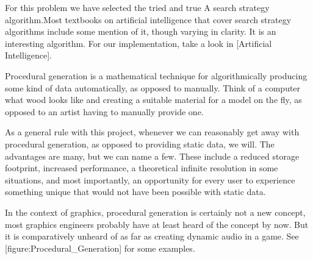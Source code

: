 For this problem we have selected the tried and true A\high{*} search strategy algorithm. Most textbooks on artificial intelligence that cover search strategy algorithms include some mention of it, though varying in clarity. It is an interesting algorithm. For our implementation, take a look in [Artificial Intelligence].

    {}

Procedural generation is a mathematical technique for algorithmically producing some kind of data automatically, as opposed to manually. Think of a computer  what wood looks like and creating a suitable material for a model on the fly, as opposed to an artist having to manually provide one. 

    {}
    {}
    {}
    {}
    {}
    {}
    {}
    \stopcombination

As a general rule with this project, whenever we can reasonably get away with procedural generation, as opposed to providing static data, we will. The advantages are many, but we can name a few. These include a reduced storage footprint, increased performance, a theoretical infinite resolution in some situations, and most importantly, an opportunity for every user to experience something unique that would not have been possible with static data.

In the context of graphics, procedural generation is certainly not a new concept, most graphics engineers probably have at least heard of the concept by now. But it is comparatively unheard of as far as creating dynamic audio in a game. See [figure:Procedural_Generation] for some examples.


